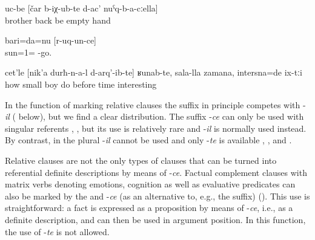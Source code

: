 \begin{exe}
		\ex	\label{ex:the brothers who came home with empty hands}
		\gll	uc-be	[čar	b-iχ-ub-te	d-ac'	nuˁq-b-a-cːella]\\
			brother	back	be empty	hand\\
		\glt	{}

\ex	\label{I am the sun that shines (lit. goes).}
	\gll bari=da=nu	[r-uq-un-ce]\\
	sun=1=		-go.\\
	\glt	{}

	\ex	\label{ex:How the ones like made by little children, from the old times, they were interesting minor@16c}
	\gll	cet'le	[nik'a	durħ-n-a-l	d-arq'-ib-te]	ʁunab-te,	sala-lla	zamana, 	intersna=de	ix-tːi\\
		how	small	boy	do 		before	time	interesting	\\
	\glt	{}
\end{exe}

In the function of marking relative clauses the suffix in principle competes with -\textit{il} ( below), but we find a clear distribution. The suffix -\textit{ce} can only be used with singular referents , , but its use is relatively rare and -\textit{il} is normally used instead. By contrast, in the plural -\textit{il} cannot be used and only -\textit{te} is available , , and .

Relative clauses are not the only types of clauses that can be turned into referential definite descriptions by means of -\textit{ce}. Factual complement clauses with matrix verbs denoting emotions, cognition as well as evaluative predicates can also be marked by the  and -\textit{ce} (as an alternative to, e.g., the  suffix) (). This use is straightforward: a fact is expressed as a proposition by means of -\textit{ce}, i.e., as a definite description, and can then be used in argument position. In this function, the use of -\textit{te} is not allowed.

